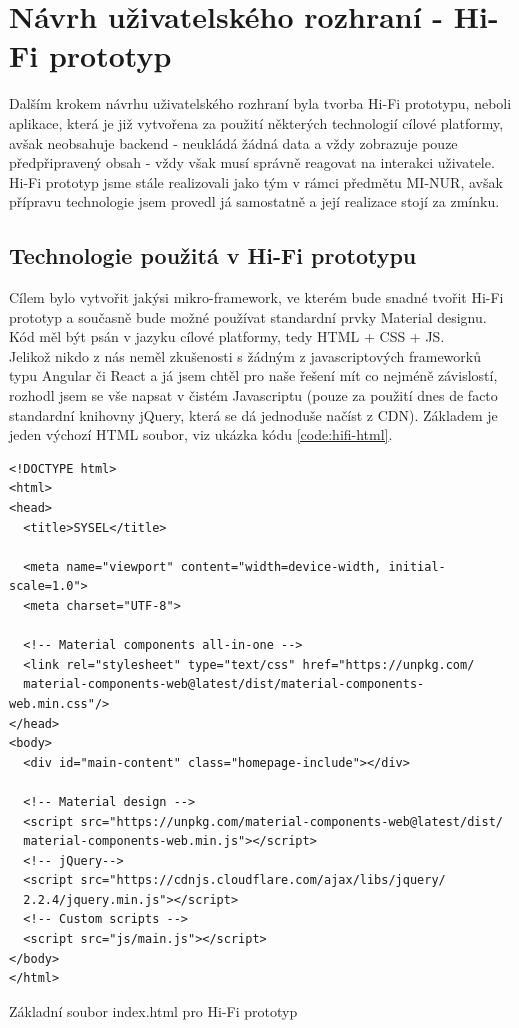 \section{Návrh uživatelského rozhraní - Hi-Fi prototyp}

Dalším krokem návrhu uživatelského rozhraní byla tvorba Hi-Fi prototypu, neboli aplikace, která je již vytvořena za použití některých technologií cílové platformy, avšak neobsahuje backend - neukládá žádná data a vždy zobrazuje pouze předpřipravený obsah - vždy však musí správně reagovat na interakci uživatele.\\
Hi-Fi prototyp jsme stále realizovali jako tým v rámci předmětu MI-NUR, avšak přípravu technologie jsem provedl já samostatně a její realizace stojí za zmínku.


\subsection{Technologie použitá v Hi-Fi prototypu}

Cílem bylo vytvořit jakýsi mikro-framework, ve kterém bude snadné tvořit Hi-Fi prototyp a současně bude možné používat standardní prvky Material designu. Kód měl být psán v jazyku cílové platformy, tedy HTML + CSS + JS.\\
Jelikož nikdo z nás neměl zkušenosti s žádným z javascriptových frameworků typu Angular či React a já jsem chtěl pro naše řešení mít co nejméně závislostí, rozhodl jsem se vše napsat v čistém Javascriptu (pouze za použití dnes de facto standardní knihovny jQuery, která se dá jednoduše načíst z CDN). Základem je jeden výchozí HTML soubor, viz ukázka kódu \ref{code:hifi-html}.

\begin{listing}[H]
\begin{verbatim}
<!DOCTYPE html>
<html>
<head>
  <title>SYSEL</title>

  <meta name="viewport" content="width=device-width, initial-scale=1.0">
  <meta charset="UTF-8">

  <!-- Material components all-in-one -->
  <link rel="stylesheet" type="text/css" href="https://unpkg.com/
  material-components-web@latest/dist/material-components-web.min.css"/>
</head>
<body>
  <div id="main-content" class="homepage-include"></div>

  <!-- Material design -->
  <script src="https://unpkg.com/material-components-web@latest/dist/
  material-components-web.min.js"></script>
  <!-- jQuery-->
  <script src="https://cdnjs.cloudflare.com/ajax/libs/jquery/
  2.2.4/jquery.min.js"></script>
  <!-- Custom scripts -->
  <script src="js/main.js"></script>
</body>
</html>
\end{verbatim}
\caption{Základní soubor index.html pro Hi-Fi prototyp} \label{code:hifi-html}
\end{listing}

